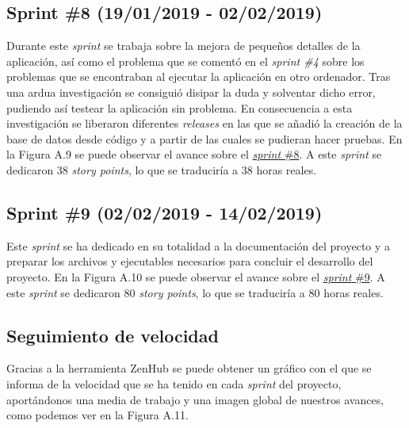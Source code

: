 
\subsection{Sprint \#8 (19/01/2019 - 02/02/2019)}

Durante este \textit{sprint} se trabaja sobre la mejora de pequeños detalles de la aplicación, así como el problema que se comentó en el \textit{sprint \#4} sobre los problemas que se encontraban al ejecutar la aplicación en otro ordenador. Tras una ardua investigación se consiguió disipar la duda y solventar dicho error, pudiendo así testear la aplicación sin problema. En consecuencia a esta investigación se liberaron diferentes \textit{releases} en las que se añadió la creación de la base de datos desde código y a partir de las cuales se pudieran hacer pruebas. En la Figura A.9 se puede observar el avance sobre el \href{https://github.com/FranBurgos/TFG/milestone/9?closed=1}{\textit{sprint} \#8}. A este \textit{sprint} se dedicaron 38 \textit{story points}, lo que se traduciría a 38 horas reales.


\subsection{Sprint \#9 (02/02/2019 - 14/02/2019)}

Este \textit{sprint} se ha dedicado en su totalidad a la documentación del proyecto y a preparar los archivos y ejecutables necesarios para concluir el desarrollo del proyecto. En la Figura A.10 se puede observar el avance sobre el \href{https://github.com/FranBurgos/TFG/milestone/10?closed=1}{\textit{sprint} \#9}. A este \textit{sprint} se dedicaron 80 \textit{story points}, lo que se traduciría a 80 horas reales.


\subsection{Seguimiento de velocidad}

Gracias a la herramienta ZenHub se puede obtener un gráfico con el que se informa de la velocidad que se ha tenido en cada \textit{sprint} del proyecto, aportándonos una media de trabajo y una imagen global de nuestros avances, como podemos ver en la Figura A.11.


